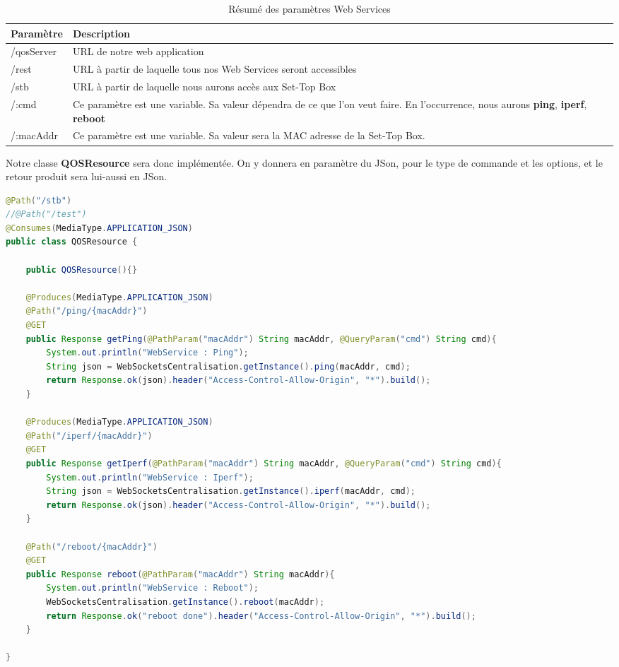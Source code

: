 \medskip

\begin{table}[H]
\begin{tabularx}{\textwidth}{|m{3cm}|X|l|}
  \hline
  \bf{Paramètre} & \bf{Description} \\
  \hline
  /qosServer & URL de notre web application\\
  \hline  
  /rest & URL à partir de laquelle tous nos Web Services seront accessibles\\
  \hline  
  /stb & URL à partir de laquelle nous aurons accès aux Set-Top Box \\
  \hline  
  /:cmd & Ce paramètre est une variable. Sa valeur dépendra de ce que l'on veut faire. En l'occurrence, nous aurons \textbf{ping}, \textbf{iperf}, \textbf{reboot} \\
  \hline
  /:macAddr & Ce paramètre est une variable. Sa valeur sera la MAC adresse de la Set-Top Box.
\end{tabularx}
\caption{Résumé des paramètres Web Services}
\label{tab:classDiagram}
\end{table}

\medskip

Notre classe \textbf{QOSResource} sera donc implémentée. On y donnera en paramètre du JSon, pour le type de commande et les options, et le retour produit sera lui-aussi en JSon.

\begin{lstlisting}[language=Java, caption={Implémentation du Web Service}]
@Path("/stb")
//@Path("/test")
@Consumes(MediaType.APPLICATION_JSON)
public class QOSResource {
	
	public QOSResource(){}
	
	@Produces(MediaType.APPLICATION_JSON)
	@Path("/ping/{macAddr}")
	@GET
	public Response getPing(@PathParam("macAddr") String macAddr, @QueryParam("cmd") String cmd){
		System.out.println("WebService : Ping");
		String json = WebSocketsCentralisation.getInstance().ping(macAddr, cmd);
		return Response.ok(json).header("Access-Control-Allow-Origin", "*").build();
	}
	
	@Produces(MediaType.APPLICATION_JSON)
	@Path("/iperf/{macAddr}")
	@GET
	public Response getIperf(@PathParam("macAddr") String macAddr, @QueryParam("cmd") String cmd){
		System.out.println("WebService : Iperf");
		String json = WebSocketsCentralisation.getInstance().iperf(macAddr, cmd);
		return Response.ok(json).header("Access-Control-Allow-Origin", "*").build();
	}
	
	@Path("/reboot/{macAddr}")
	@GET
	public Response reboot(@PathParam("macAddr") String macAddr){
		System.out.println("WebService : Reboot");
		WebSocketsCentralisation.getInstance().reboot(macAddr);
		return Response.ok("reboot done").header("Access-Control-Allow-Origin", "*").build();
	}
	
}

\end{lstlisting}

